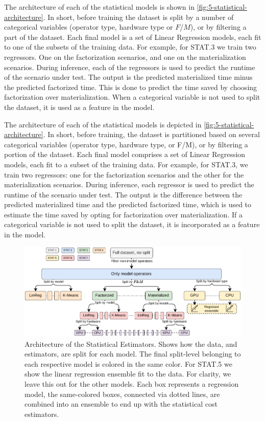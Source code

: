 The architecture of each of the statistical models is shown in \autoref{fig:5-statistical-architecture}. In short, before training the dataset is split by a number of categorical variables (operator type, hardware type or $F$/$M$), or by filtering a part of the dataset. Each final model is a set of Linear Regression models, each fit to one of the subsets of the training data. For example, for STAT.3 we train two regressors. One on the factorization scenarios, and one on the materialization scenarios. During inference, each of the regressors is used to predict the runtime of the scenario under test. The output is the predicted materialized time minus the predicted factorized time. This is done to predict the time saved by choosing factorization over materialization. When a categorical variable is not used to split the dataset, it is used as a feature in the model.

The architecture of each of the statistical models is depicted in \autoref{fig:5-statistical-architecture}. In short, before training, the dataset is partitioned based on several categorical variables (operator type, hardware type, or F/M), or by filtering a portion of the dataset. Each final model comprises a set of Linear Regression models, each fit to a subset of the training data. For example, for STAT.3, we train two regressors: one for the factorization scenarios and the other for the materialization scenarios. During inference, each regressor is used to predict the runtime of the scenario under test. The output is the difference between the predicted materialized time and the predicted factorized time, which is used to estimate the time saved by opting for factorization over materialization. If a categorical variable is not used to split the dataset, it is incorporated as a feature in the model.

\begin{figure}[ht]
    \centering
    \includegraphics[width=\linewidth]{chapters/05_cost_estimation/figures/statistical-architecture.pdf}
    \caption[Statistical Estimator Architecture]{Architecture of the Statistical Estimators. Shows how the data, and estimators, are split for each model. The final split-level belonging to each respective model is colored in the same color. For STAT.5 we show the linear regression ensemble fit to the data. For clarity, we leave this out for the other models. Each box represents a regression model, the same-colored boxes, connected via dotted lines, are combined into an ensemble to end up with the statistical cost estimators.}
    \label{fig:5-statistical-architecture}
\end{figure}


